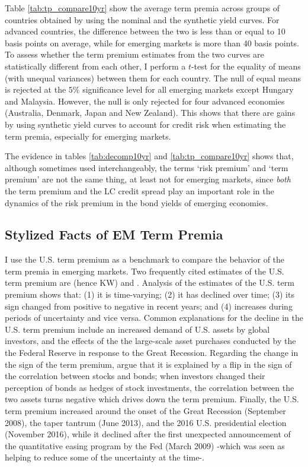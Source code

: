 {Table \ref{tab:tp_compare10yr} show the average term premia across groups of countries obtained by using the nominal and the synthetic yield curves. For advanced countries, the difference between the two is less than or equal to 10 basis points on average, while for emerging markets is more than 40 basis points. To assess whether the term premium estimates from the two curves are statistically different from each other, I perform a $t$-test for the equality of means (with unequal variances) between them for each country. The null of equal means is rejected at the $5$\% significance level for all emerging markets except Hungary and Malaysia. However, the null is only rejected for four advanced economies (Australia, Denmark, Japan and New Zealand). This shows that there are gains by using synthetic yield curves to account for credit risk when estimating the term premia, especially for emerging markets.
	

The evidence in tables \ref{tab:decomp10yr} and \ref{tab:tp_compare10yr} shows that, although sometimes used interchangeably, the terms `risk premium' and `term premium' are not the same thing, at least not for emerging markets, since \textit{both} the term premium and the LC credit spread play an important role in the dynamics of the risk premium in the bond yields of emerging economies.

\subsection{Stylized Facts of EM Term Premia}
I use the U.S. term premium as a benchmark to compare the behavior of the term premia in emerging markets. Two frequently cited estimates of the U.S. term premium are \cite{KimWright:2005} (hence KW) and \cite*{ACM:2013}. Analysis of the estimates of the U.S. term premium shows that: (1) it is time-varying; (2) it has declined over time; (3) its sign changed from positive to negative in recent years; and (4) increases during periods of uncertainty and vice versa. Common explanations for the decline in the U.S. term premium include an increased demand of U.S. assets by global investors, and the effects of the the large-scale asset purchases conducted by the the Federal Reserve in response to the Great Recession. Regarding the change in the sign of the term premium, \cite*{CampbellSunderamViceira:2017} argue that it is explained by a flip in the sign of the correlation between stocks and bonds; when investors changed their perception of bonds as hedges of stock investments, the correlation between the two assets turns negative which drives down the term premium. Finally, the U.S. term premium increased around the onset of the Great Recession (September 2008), the taper tantrum (June 2013), and the 2016 U.S. presidential election (November 2016), while it declined after the first unexpected announcement of the quantitative easing program by the Fed (March 2009) -which was seen as helping to reduce some of the uncertainty at the time-.

}
